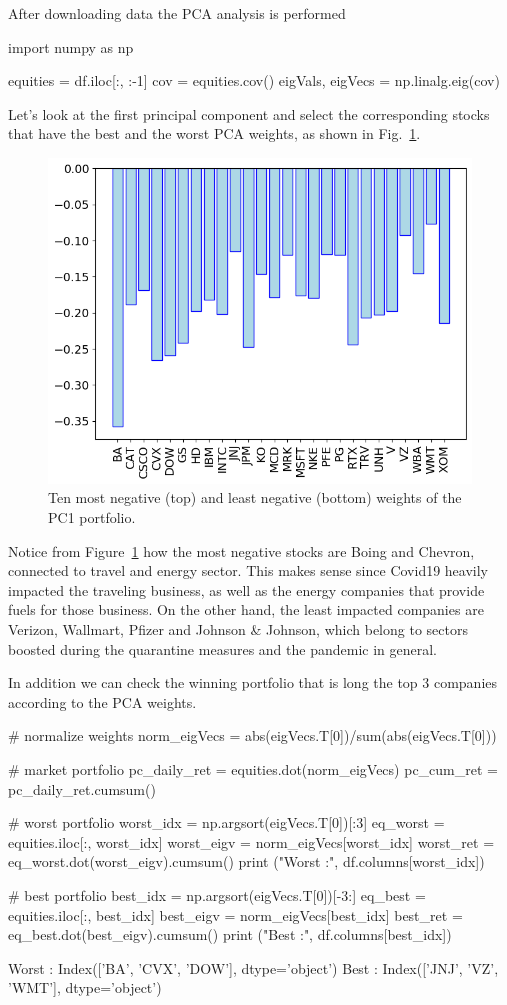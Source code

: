 After downloading data the PCA analysis is performed
\begin{ipython}
import numpy as np
	
equities = df.iloc[:, :-1]
cov = equities.cov()
eigVals, eigVecs = np.linalg.eig(cov)
\end{ipython}

Let's look at the first principal component and select the corresponding stocks that have the best and the worst PCA weights, as shown in Fig.~\ref{fig:pca_covid_neg}.

\begin{figure}[htb]
\centering
\includegraphics[width=.6\textwidth]{figures/pc1_weights_covid}
\caption{Ten most negative (top) and least negative (bottom) weights of the PC1 portfolio.}
\label{fig:pca_covid_neg}
\end{figure}

Notice from Figure~\ref{fig:pca_covid_neg} how the most negative stocks are Boing and Chevron, connected to travel and energy sector. This makes sense since Covid19 heavily impacted the traveling business, as well as the energy companies that provide fuels for those business. On the other hand, the least impacted companies are Verizon, Wallmart, Pfizer and Johnson \& Johnson, which belong to sectors boosted during the quarantine measures and the pandemic in general.

In addition we can check the winning portfolio that is long the top 3 companies according to the PCA weights.

\begin{ipython}
# normalize weights
norm_eigVecs = abs(eigVecs.T[0])/sum(abs(eigVecs.T[0]))
	
# market portfolio
pc_daily_ret = equities.dot(norm_eigVecs)
pc_cum_ret = pc_daily_ret.cumsum()
	
# worst portfolio
worst_idx = np.argsort(eigVecs.T[0])[:3]
eq_worst = equities.iloc[:, worst_idx]
worst_eigv = norm_eigVecs[worst_idx]
worst_ret = eq_worst.dot(worst_eigv).cumsum()
print ("Worst :", df.columns[worst_idx])
	
# best portfolio         
best_idx = np.argsort(eigVecs.T[0])[-3:]
eq_best = equities.iloc[:, best_idx]
best_eigv = norm_eigVecs[best_idx]
best_ret = eq_best.dot(best_eigv).cumsum()
print ("Best :", df.columns[best_idx])
\end{ipython}
\begin{ioutput}
Worst : Index(['BA', 'CVX', 'DOW'], dtype='object')
Best : Index(['JNJ', 'VZ', 'WMT'], dtype='object')
\end{ioutput}

